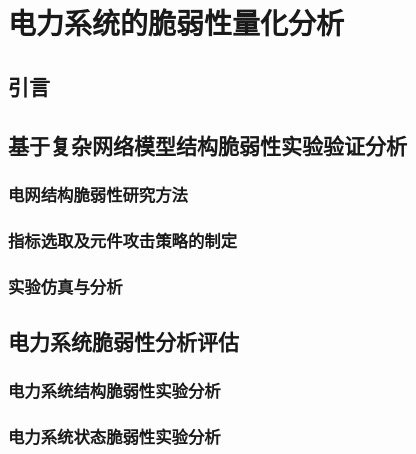 \chapter{电力系统的脆弱性量化分析}
\label{cha:quantiAnaly}

\section{引言}
\label{sec:index5}




\section{基于复杂网络模型结构脆弱性实验验证分析}
\label{sec:modelIntroduce}



\subsection{电网结构脆弱性研究方法}
\label{sec:modelIntroduce}





\subsection{指标选取及元件攻击策略的制定}
\label{sec:modelIntroduce}




\subsection{实验仿真与分析}
\label{sec:modelIntroduce}



\section{电力系统脆弱性分析评估}
\label{sec:singleAssessment}




\subsection{电力系统结构脆弱性实验分析}
\label{sec:singleAnalysis_fabric}




\subsection{电力系统状态脆弱性实验分析}
\label{sec:singleAnalysis_status}





